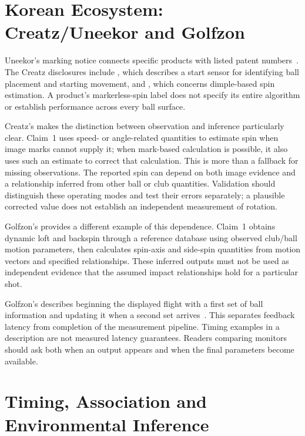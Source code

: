 \section{Korean Ecosystem: Creatz/Uneekor and Golfzon}

Uneekor's marking notice connects specific products with listed patent numbers~\cite{uneekorpatents}.
The Creatz disclosures include , which describes a start sensor for identifying ball placement and starting movement, and , which concerns dimple-based spin estimation.
A product's markerless-spin label does not specify its entire algorithm or establish performance across every ball surface.

Creatz's  makes the distinction between observation and inference particularly clear.
Claim~1 uses speed- or angle-related quantities to estimate spin when image marks cannot supply it; when mark-based calculation is possible, it also uses such an estimate to correct that calculation.
This is more than a fallback for missing observations.
The reported spin can depend on both image evidence and a relationship inferred from other ball or club quantities.
Validation should distinguish these operating modes and test their errors separately; a plausible corrected value does not establish an independent measurement of rotation.

Golfzon's  provides a different example of this dependence.
Claim~1 obtains dynamic loft and backspin through a reference database using observed club/ball motion parameters, then calculates spin-axis and side-spin quantities from motion vectors and specified relationships.
These inferred outputs must not be used as independent evidence that the assumed impact relationships hold for a particular shot.

Golfzon's  describes beginning the displayed flight with a first set of ball information and updating it when a second set arrives~\cite{us9242158}.
This separates feedback latency from completion of the measurement pipeline.
Timing examples in a description are not measured latency guarantees.
Readers comparing monitors should ask both when an output appears and when the final parameters become available.

\section{Timing, Association and Environmental Inference}

